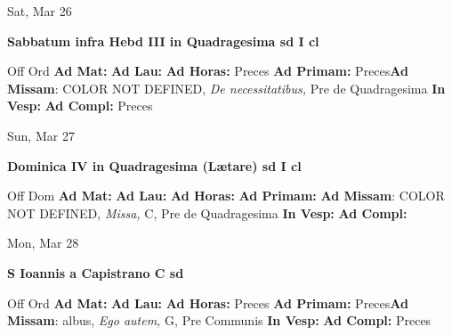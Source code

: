\documentclass[10pt]{memoir}
\begin{document}
\begin{center}
\begin{minipage}{3.5in}
\vspace{2em}
\begin{center}Sat, Mar 26
\end{center}
\textbf{ \large Sabbatum infra Hebd III in Quadragesima
\textnormal{\normalsize sd I cl}}

\begin{justify}Off Ord
\textbf{Ad Mat: }
\textbf{Ad Lau: }
\textbf{Ad Horas: }Preces
\textbf{Ad Primam: }Preces\textbf{Ad Missam}: COLOR NOT DEFINED, \textit{De necessitatibus,} Pre de Quadragesima
\textbf{In Vesp: }
\textbf{Ad Compl: }Preces
\end{justify}
\end{minipage}
\end{center}

\begin{center}
\begin{minipage}{3.5in}
\vspace{2em}
\begin{center}Sun, Mar 27
\end{center}
\textbf{ \large Dominica IV in Quadragesima (Lætare)
\textnormal{\normalsize sd I cl}}

\begin{justify}Off Dom
\textbf{Ad Mat: }
\textbf{Ad Lau: }
\textbf{Ad Horas: }
\textbf{Ad Primam: }\textbf{Ad Missam}: COLOR NOT DEFINED, \textit{Missa,} C, Pre de Quadragesima
\textbf{In Vesp: }
\textbf{Ad Compl: }
\end{justify}
\end{minipage}
\end{center}

\begin{center}
\begin{minipage}{3.5in}
\vspace{2em}
\begin{center}Mon, Mar 28
\end{center}
\textbf{ \large S Ioannis a Capistrano C
\textnormal{\normalsize sd}}

\begin{justify}Off Ord
\textbf{Ad Mat: }
\textbf{Ad Lau: }
\textbf{Ad Horas: }Preces
\textbf{Ad Primam: }Preces\textbf{Ad Missam}: albus, \textit{Ego autem,} G, Pre Communis
\textbf{In Vesp: }
\textbf{Ad Compl: }Preces
\end{justify}
\end{minipage}
\end{center}
\end{document}

